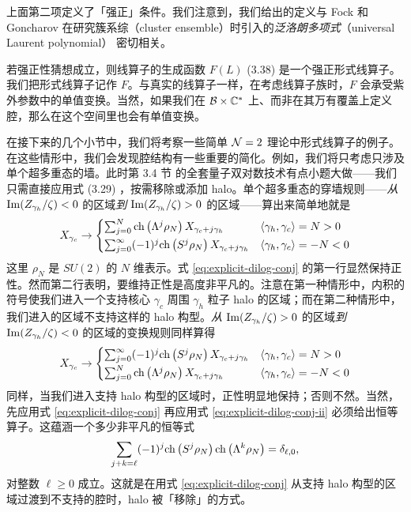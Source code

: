 上面第二项定义了「强正」条件。我们注意到，我们给出的定义与 Fock 和 Goncharov 在研究簇系综（cluster ensemble）时引入的\emph{泛洛朗多项式}（universal Laurent polynomial）\cite{MR2567745} 密切相关。

若强正性猜想成立，则线算子的生成函数 $F(L)$ (3.38)%
是一个强正形式线算子。我们把形式线算子记作 $F$。与真实的线算子一样，在考虑线算子族时，$F$ 会承受紫外参数中的单值变换。当然，如果我们在 $\mathcal{B}\times\mathbb{C}^*$ 上、而非在其万有覆盖上定义腔，那么在这个空间里也会有单值变换。

在接下来的几个小节中，我们将考察一些简单 $\mathcal{N}=2$ 理论中形式线算子的例子。在这些情形中，我们会发现腔结构有一些重要的简化。例如，我们将只考虑只涉及单个超多重态的墙。此时第 3.4 节%
的全套量子双对数技术有点小题大做——我们只需直接应用式 (3.29)%
，按需移除或添加 halo。单个超多重态的穿墙规则——\emph{从} ${\rm Im}(Z_{\gamma_h}/\zeta)<0$ 的区域\emph{到} ${\rm Im}(Z_{\gamma_h}/\zeta)>0$ 的区域——算出来简单地就是
\begin{equation}\label{eq:explicit-dilog-conj}
X_{\gamma_c} \to \begin{cases}
\sum_{j=0}^N {\rm ch}\left(\Lambda^j \rho_N\right) X_{\gamma_c + j\gamma_h} & \langle\gamma_h,\gamma_c\rangle = N > 0 \\[2pt]
\sum_{j=0}^\infty (-1)^j {\rm ch}\left(S^j \rho_N\right) X_{\gamma_c + j\gamma_h} & \langle\gamma_h,\gamma_c\rangle = -N < 0
\end{cases}
\end{equation}
这里 $\rho_N$ 是 $SU(2)$ 的 $N$ 维表示。式 \eqref{eq:explicit-dilog-conj} 的第一行显然保持正性。然而第二行表明，要维持正性是高度非平凡的。注意在第一种情形中，内积的符号使我们进入一个支持核心 $\gamma_c$ 周围 $\gamma_h$ 粒子 halo 的区域；而在第二种情形中，我们进入的区域不支持这样的 halo 构型。\emph{从} ${\rm Im}(Z_{\gamma_h}/\zeta)>0$ 的区域\emph{到} ${\rm Im}(Z_{\gamma_h}/\zeta)<0$ 的区域的变换规则同样算得
\begin{equation}\label{eq:explicit-dilog-conj-ii}
X_{\gamma_c} \to \begin{cases}
\sum_{j=0}^\infty (-1)^j {\rm ch}\left(S^j \rho_N\right) X_{\gamma_c + j\gamma_h} & \langle\gamma_h,\gamma_c\rangle = N > 0 \\[2pt]
\sum_{j=0}^N {\rm ch}\left(\Lambda^j \rho_N\right) X_{\gamma_c + j\gamma_h} & \langle\gamma_h,\gamma_c\rangle = -N < 0
\end{cases}
\end{equation}
同样，当我们进入支持 halo 构型的区域时，正性明显地保持；否则不然。当然，先应用式 \eqref{eq:explicit-dilog-conj} 再应用式 \eqref{eq:explicit-dilog-conj-ii} 必须给出恒等算子。这蕴涵一个多少非平凡的恒等式
\begin{equation}\label{eq:Char-Ident}
\sum_{j+k=\ell} (-1)^j {\rm ch}\left(S^j \rho_N\right) {\rm ch}\left(\Lambda^k \rho_N\right) = \delta_{\ell,0},
\end{equation}
对整数 $\ell\geq 0$ 成立。这就是在用式 \eqref{eq:explicit-dilog-conj} 从支持 halo 构型的区域过渡到不支持的腔时，halo 被「移除」的方式。

